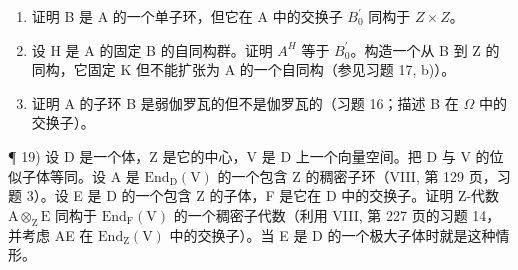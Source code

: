 \begin{enumerate}
\def\labelenumi{\alph{enumi})}
\setcounter{enumi}{1}
\item
  证明 B 是 A 的一个单子环，但它在 A 中的交换子 \(B_{0}^{\prime}\) 同构于 \(Z \times Z\)。
\item
  设 H 是 A 的固定 B 的自同构群。证明 \(A^{H}\) 等于 \(B_{0}^{\prime}\)。构造一个从 B 到 Z 的同构，它固定 K 但不能扩张为 A 的一个自同构（参见习题 17, b)）。
\item
  证明 A 的子环 B 是弱伽罗瓦的但不是伽罗瓦的（习题 16；描述 B 在 \(\Omega\) 中的交换子）。
\end{enumerate}

¶ 19) 设 D 是一个体，Z 是它的中心，V 是 D 上一个向量空间。把 D 与 V 的位似子体等同。设 A 是 \(\mathrm{End}_{\mathrm{D}}(\mathrm{V})\) 的一个包含 Z 的稠密子环（VIII, 第 129 页，习题 3）。设 E 是 D 的一个包含 Z 的子体，F 是它在 D 中的交换子。证明 Z-代数 \(\mathrm{A} \otimes_{\mathrm{Z}} \mathrm{E}\) 同构于 \(\mathrm{End}_{\mathrm{F}}(\mathrm{V})\) 的一个稠密子代数（利用 VIII, 第 227 页的习题 14，并考虑 AE 在 \(\mathrm{End}_{\mathrm{Z}}(\mathrm{V})\) 中的交换子）。当 E 是 D 的一个极大子体时就是这种情形。

